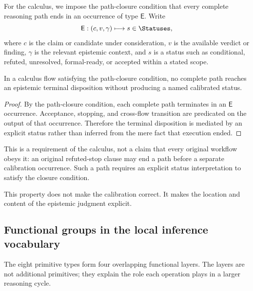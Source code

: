 For the calculus, we impose the path-closure condition that every complete
reasoning path ends in an occurrence of type $\mathsf{E}$. Write
\[
  \mathsf{E}:(c,v,\gamma)\longmapsto s\in\Statuses,
\]
where $c$ is the claim or candidate under consideration, $v$ is the available
verdict or finding, $\gamma$ is the relevant epistemic context, and $s$ is a
status such as conditional, refuted, unresolved, formal-ready, or accepted
within a stated scope.

\begin{proposition}
In a calculus flow satisfying the path-closure condition, no complete path reaches an epistemic terminal
disposition without producing a named calibrated status.
\end{proposition}

\begin{proof}
By the path-closure condition, each complete path terminates in an
$\mathsf{E}$ occurrence. Acceptance, stopping, and cross-flow transition are
predicated on the output of that occurrence. Therefore the terminal
disposition is mediated by an explicit status rather than inferred from the
mere fact that execution ended.
\end{proof}

This is a requirement of the calculus, not a claim that every original workflow obeys it: an original refuted-stop clause may end a path before a separate calibration occurrence. Such a path requires an explicit status interpretation to satisfy the closure condition.

This property does not make the calibration correct. It makes the location and
content of the epistemic judgment explicit.

\subsection{Functional groups in the local inference vocabulary}

The eight primitive types form four overlapping functional layers. The layers
are not additional primitives; they explain the role each operation plays in a
larger reasoning cycle.

